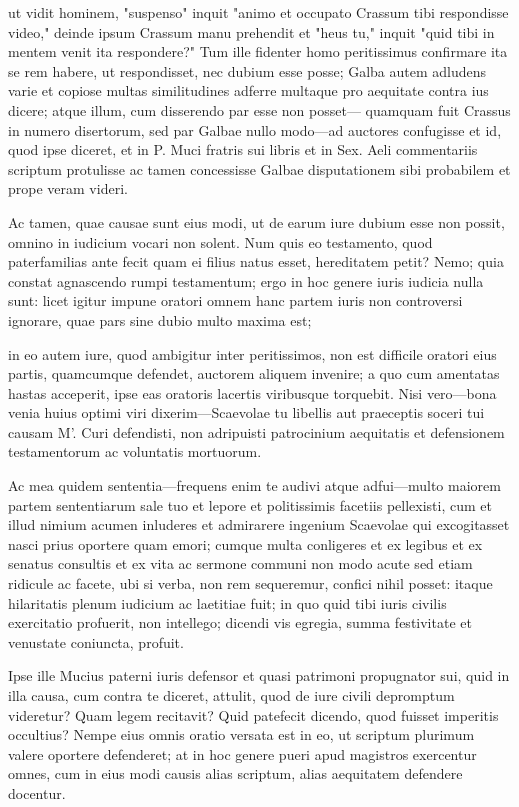 ut vidit hominem, "suspenso" inquit "animo et occupato Crassum tibi respondisse video," deinde ipsum Crassum manu prehendit et "heus tu," inquit "quid tibi in mentem venit ita respondere?" Tum ille fidenter homo peritissimus confirmare ita se rem habere, ut respondisset, nec dubium esse posse; Galba autem adludens varie et copiose multas similitudines adferre multaque pro aequitate contra ius dicere; atque illum, cum disserendo par esse non posset— quamquam fuit Crassus in numero disertorum, sed par Galbae nullo modo—ad auctores confugisse et id, quod ipse diceret, et in P. Muci fratris sui libris et in Sex. Aeli commentariis scriptum protulisse ac tamen concessisse Galbae disputationem sibi probabilem et prope veram videri.

 Ac tamen, quae causae sunt eius modi, ut de earum iure dubium esse non possit, omnino in iudicium vocari non solent. Num quis eo testamento, quod paterfamilias ante fecit quam ei filius natus esset, hereditatem petit? Nemo; quia constat agnascendo rumpi testamentum; ergo in hoc genere iuris iudicia nulla sunt: licet igitur impune oratori omnem hanc partem iuris non controversi ignorare, quae pars sine dubio multo maxima est;

 in eo autem iure, quod ambigitur inter peritissimos, non est difficile oratori eius partis, quamcumque defendet, auctorem aliquem invenire; a quo cum amentatas hastas acceperit, ipse eas oratoris lacertis viribusque torquebit. Nisi vero—bona venia huius optimi viri dixerim—Scaevolae tu libellis aut praeceptis soceri tui causam M'. Curi defendisti, non adripuisti patrocinium aequitatis et defensionem testamentorum ac voluntatis mortuorum.

 Ac mea quidem sententia—frequens enim te audivi atque adfui—multo maiorem partem sententiarum sale tuo et lepore et politissimis facetiis pellexisti, cum et illud nimium acumen inluderes et admirarere ingenium Scaevolae qui excogitasset nasci prius oportere quam emori; cumque multa conligeres et ex legibus et ex senatus consultis et ex vita ac sermone communi non modo acute sed etiam ridicule ac facete, ubi si verba, non rem sequeremur, confici nihil posset: itaque hilaritatis plenum iudicium ac laetitiae fuit; in quo quid tibi iuris civilis exercitatio profuerit, non intellego; dicendi vis egregia, summa festivitate et venustate coniuncta, profuit.

 Ipse ille Mucius paterni iuris defensor et quasi patrimoni propugnator sui, quid in illa causa, cum contra te diceret, attulit, quod de iure civili depromptum videretur? Quam legem recitavit? Quid patefecit dicendo, quod fuisset imperitis occultius? Nempe eius omnis oratio versata est in eo, ut scriptum plurimum valere oportere defenderet; at in hoc genere pueri apud magistros exercentur omnes, cum in eius modi causis alias scriptum, alias aequitatem defendere docentur.

